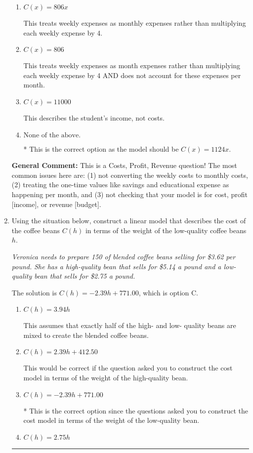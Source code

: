 \documentclass{extbook}[14pt]
\newcommand{\litem}[1]{\item #1

\rule{\textwidth}{0.4pt}}
\begin{document}
\begin{enumerate}
{\begin{enumerate}[label=\Alph*.]
This describes the student's income as if they received the savings and educational expense each month.
\item \( C(x) = 806 x \)

This treats weekly expenses as monthly expenses rather than multiplying each weekly expense by 4.
\item \( C(x) = 806 \)

This treats weekly expenses as month expenses rather than multiplying each weekly expense by 4 AND does not account for these expenses per month.
\item \( C(x) = 11000 \)

This describes the student's income, not costs.
\item \( \text{None of the above.} \)

* This is the correct option as the model should be $C(x) = 1124 x$.
\end{enumerate}

\textbf{General Comment:} This is a Costs, Profit, Revenue question! The most common issues here are: (1) not converting the weekly costs to monthly costs, (2) treating the one-time values like savings and educational expense as happening per month, and (3) not checking that your model is for cost, profit [income], or revenue [budget].
}
\litem{
Using the situation below, construct a linear model that describes the cost of the coffee beans $C(h)$ in terms of the weight of the low-quality coffee beans $h$.

\begin{center}
    \textit{ Veronica needs to prepare 150 of blended coffee beans selling for \$3.62 per pound. She has a high-quality bean that sells for \$5.14 a pound and a low-quality bean that sells for \$2.75 a pound. }
\end{center}
The solution is \( C(h) = -2.39 h + 771.00 \), which is option C.\begin{enumerate}[label=\Alph*.]
\item \( C(h) = 3.94 h \)

This assumes that exactly half of the high- and low- quality beans are mixed to create the blended coffee beans.
\item \( C(h) = 2.39 h + 412.50 \)

This would be correct if the question asked you to construct the cost model in terms of the weight of the high-quality bean.
\item \( C(h) = -2.39 h + 771.00 \)

* This is the correct option since the questions asked you to construct the cost model in terms of the weight of the low-quality bean.
\item \( C(h) = 2.75 h \)


\end{enumerate}}
\end{enumerate}
\end{document}

